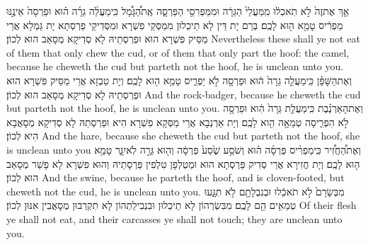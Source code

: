 {אַ֤ךְ אֶת\maqqaf זֶה֙ לֹ֣א תֹֽאכְל֔וּ מִֽמַּעֲלֵי֙ הַגֵּרָ֔ה וּמִמַּפְרִסֵ֖י הַפַּרְסָ֑ה אֶֽת\maqqaf הַ֠גָּמָ֠ל כִּֽי\maqqaf מַעֲלֵ֨ה גֵרָ֜ה ה֗וּא וּפַרְסָה֙ אֵינֶ֣נּוּ מַפְרִ֔יס טָמֵ֥א ה֖וּא לָכֶֽם׃}
{בְּרַם יָת דֵּין לָא תֵיכְלוּן מִמַּסְּקֵי פִשְׁרָא וּמִסְּדִיקֵי פַרְסְתָא יָת גַּמְלָא אֲרֵי מַסֵּיק פִּשְׁרָא הוּא וּפַרְסְתֵיהּ לָא סְדִיקָא מְסָאַב הוּא לְכוֹן׃}
{Nevertheless these shall ye not eat of them that only chew the cud, or of them that only part the hoof: the camel, because he cheweth the cud but parteth not the hoof, he is unclean unto you.}{}
{וְאֶת\maqqaf הַשָּׁפָ֗ן כִּֽי\maqqaf מַעֲלֵ֤ה גֵרָה֙ ה֔וּא וּפַרְסָ֖ה לֹ֣א יַפְרִ֑יס טָמֵ֥א ה֖וּא לָכֶֽם׃}
{וְיָת טַבְזָא אֲרֵי מַסֵּיק פִּשְׁרָא הוּא וּפַרְסְתֵיהּ לָא סְדִיקָא מְסָאַב הוּא לְכוֹן׃}
{And the rock-badger, because he cheweth the cud but parteth not the hoof, he is unclean unto you.}{}
{וְאֶת\maqqaf הָאַרְנֶ֗בֶת כִּֽי\maqqaf מַעֲלַ֤ת גֵּרָה֙ הִ֔וא וּפַרְסָ֖ה לֹ֣א הִפְרִ֑יסָה טְמֵאָ֥ה הִ֖וא לָכֶֽם׃}
{וְיָת אַרְנְבָא אֲרֵי מַסְּקָא פִשְׁרָא הִיא וּפַרְסְתַהּ לָא סְדִיקָא מְסָאֲבָא הִיא לְכוֹן׃}
{And the hare, because she cheweth the cud but parteth not the hoof, she is unclean unto you}{}
{וְאֶת\maqqaf הַ֠חֲזִ֠יר כִּֽי\maqqaf מַפְרִ֨יס פַּרְסָ֜ה ה֗וּא וְשֹׁסַ֥ע שֶׁ֙סַע֙ פַּרְסָ֔ה וְה֖וּא גֵּרָ֣ה לֹֽא\maqqaf יִגָּ֑ר טָמֵ֥א ה֖וּא לָכֶֽם׃}
{וְיָת חֲזִירָא אֲרֵי סְדִיק פַּרְסְתָא הוּא וּמַטְלְפָן טִלְפִין פַּרְסָתֵיהּ וְהוּא פִשְׁרָא לָא פָשַׁר מְסָאַב הוּא לְכוֹן׃}
{And the swine, because he parteth the hoof, and is cloven-footed, but cheweth not the cud, he is unclean unto you.}{}
{מִבְּשָׂרָם֙ לֹ֣א תֹאכֵ֔לוּ וּבְנִבְלָתָ֖ם לֹ֣א תִגָּ֑עוּ טְמֵאִ֥ים הֵ֖ם לָכֶֽם׃}
{מִבִּשְׂרְהוֹן לָא תֵיכְלוּן וּבִנְבִילַתְהוֹן לָא תִקְרְבוּן מְסָאֲבִין אִנּוּן לְכוֹן׃}
{Of their flesh ye shall not eat, and their carcasses ye shall not touch; they are unclean unto you.}{}
